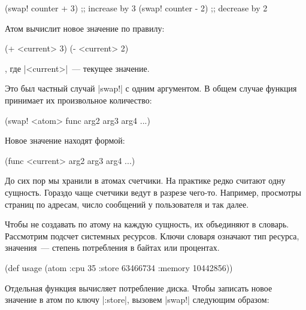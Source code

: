 \begin{english}
  \begin{clojure}
(swap! counter + 3) ;; increase by 3
(swap! counter - 2) ;; decrease by 2
  \end{clojure}
\end{english}

\noindent
Атом вычислит новое значение по правилу:

\begin{english}
  \begin{clojure}
(+ <current> 3)
(- <current> 2)
  \end{clojure}
\end{english}

\noindent
, где \spverb|<current>|~--- текущее значение.

Это был частный случай \spverb|swap!| с одним аргументом. В общем случае функция
принимает их произвольное количество:

\begin{english}
  \begin{clojure}
(swap! <atom> func arg2 arg3 arg4 ...)
  \end{clojure}
\end{english}

\noindent
Новое значение находят формой:

\begin{english}
  \begin{clojure}
(func <current> arg2 arg3 arg4 ...)
  \end{clojure}
\end{english}

До сих пор мы хранили в атомах счетчики. На практике редко считают одну
сущность. Гораздо чаще счетчики ведут в разрезе чего-то. Например, просмотры
страниц по адресам, число сообщений у пользователя и так далее.

Чтобы не создавать по атому на каждую сущность, их объединяют в
словарь. Рассмотрим подсчет системных ресурсов. Ключи словаря означают тип
ресурса, значения~--- степень потребления в байтах или процентах.

\begin{english}
  \begin{clojure}
(def usage
  (atom {:cpu 35
         :store 63466734
         :memory 10442856}))
  \end{clojure}
\end{english}

Отдельная функция вычисляет потребление диска. Чтобы записать новое значение в
атом по ключу \spverb|:store|, вызовем \spverb|swap!| следующим образом:

